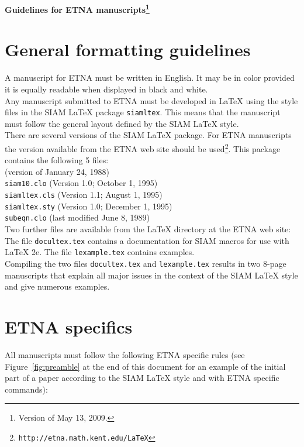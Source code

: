 \documentclass[10pt]{article}
\begin{document}
\begin{center}{\bf\Large
Guidelines for ETNA manuscripts\footnote{Version of May 13, 2009.}%
}\end{center}

\bigskip

\section{General formatting guidelines}

A manuscript for ETNA must be written in English. It may be
in color provided it is equally readable when displayed in
black and white.\\[0.5ex]
%
Any manuscript submitted to ETNA must be developed in {\LaTeX}
using the style files in the SIAM {\LaTeX} package {\tt siamltex}.
This means that the manuscript must follow
the general layout defined by the SIAM {\LaTeX} style.\\[0.5ex]
%
There are several versions of the SIAM {\LaTeX} package. For ETNA
manuscripts the version available from the ETNA web site should be
used\footnote{{\tt http://etna.math.kent.edu/LaTeX}}. This package
contains the following 5 files:\\[0.5ex]
%
 (version of January 24, 1988)\\
{\tt siam10.clo} (Version 1.0; October 1, 1995)\\
{\tt siamltex.cls} (Version 1.1; August 1, 1995)\\
{\tt siamltex.sty} (Version 1.0; December 1, 1995)\\
{\tt subeqn.clo} (last modified June 8, 1989)\\[0.5ex]
%
\noindent Two further files are available from the {\LaTeX} directory
at the ETNA web site: The file {\tt docultex.tex} contains a documentation
for SIAM macros for use with {\LaTeX} 2e. The file {\tt lexample.tex}
contains examples.\\[0.5ex]
%
Compiling the two files  {\tt docultex.tex} and {\tt lexample.tex}
results in two 8-page manuscripts that explain all major issues in
the context of the SIAM {\LaTeX} style and give numerous examples.



\section{ETNA specifics}
All manuscripts must follow the following ETNA specific rules
(see Figure~\ref{fig:preamble} at the end of this document for an
example of the initial part of a paper according to the
SIAM {\LaTeX} style and with ETNA specific commands):
\end{document}
